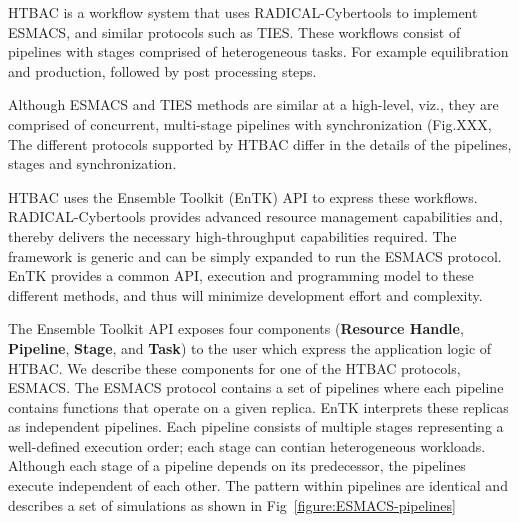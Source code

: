


HTBAC is a workflow system that uses RADICAL-Cybertools to implement ESMACS,
and similar protocols such as TIES. These workflows consist of pipelines with
stages comprised of heterogeneous tasks. For example equilibration and
production, followed by post processing steps. 

Although ESMACS and TIES methods are similar at a high-level, viz., they are
comprised of concurrent, multi-stage pipelines with synchronization 
(Fig.XXX, The different protocols supported by HTBAC differ in the details of the
pipelines, stages and synchronization. 

HTBAC uses the Ensemble Toolkit (EnTK) API to express these workflows. RADICAL-Cybertools
provides advanced resource management capabilities and, thereby delivers the
necessary high-throughput capabilities required. The framework is generic and
can be simply expanded to run the ESMACS protocol. EnTK provides a common API,
execution and programming model to these different methods, and thus will
minimize development effort and complexity.

The Ensemble Toolkit API exposes four components (\textbf{Resource
Handle}, \textbf{Pipeline}, \textbf{Stage}, and \textbf{Task}) to the user which express the
application logic of HTBAC. We describe these components for one of the HTBAC
protocols, ESMACS. The ESMACS protocol contains a set of pipelines where each
pipeline contains functions that operate on a given replica. EnTK interprets these replicas as independent pipelines. Each pipeline consists of multiple stages representing a well-defined execution order; each stage can contian heterogeneous workloads. Although each stage of a pipeline depends on its predecessor, the pipelines execute independent of each other. The pattern within pipelines are identical and describes a set of simulations as shown in Fig~\ref{figure:ESMACS-pipelines}


